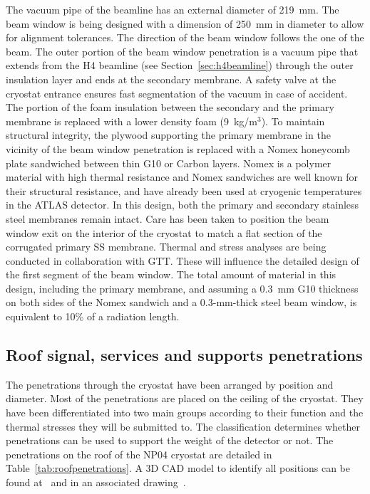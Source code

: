  The vacuum pipe of the beamline has an external diameter of 219~mm. The beam window is being designed with a dimension of 250~mm in diameter to allow for alignment tolerances.  The direction of the beam window follows the one of the beam.
The outer portion of the
beam window penetration is a vacuum pipe that extends from the H4 beamline (see Section~\ref{sec:h4beamline})  through the outer insulation layer and ends at the secondary
membrane. A safety valve at the cryostat entrance ensures fast segmentation of the vacuum in case of accident.   The
portion of the foam insulation between the secondary and the primary
membrane is replaced with a lower density foam %
(9~kg/m$^3$).
To maintain structural integrity, the plywood supporting
the primary membrane in the vicinity of the beam window penetration is
replaced with a Nomex honeycomb plate sandwiched between thin G10 or Carbon layers. Nomex is a polymer material with high thermal resistance and Nomex sandwiches are well known for their structural resistance, and have already been used at cryogenic temperatures in the ATLAS detector.
 In this design, both the
primary and secondary stainless steel membranes remain intact. Care has been taken to position the beam window exit on the interior of the cryostat to match a flat section of the corrugated primary SS membrane.
Thermal and stress analyses are being conducted in collaboration with GTT. These will influence the detailed design of the first segment of the beam window. 
The total amount of material in this design, including the primary membrane, and assuming a 0.3~mm G10 thickness on both sides of the Nomex sandwich and a 0.3-mm-thick steel beam window, is equivalent to 10\% of a radiation length. 

\subsection{Roof signal, services and supports penetrations}

The penetrations through the cryostat have been arranged by position and diameter. %
Most of the penetrations are placed on the ceiling of the cryostat. They have been differentiated into two main groups according to their function and the thermal stresses they will be submitted to. The classification determines whether penetrations can be used to support the weight of the detector or not.
The penetrations on the roof of the NP04 cryostat are detailed in Table~\ref{tab:roofpenetrations}.  
A 3D CAD model to identify all positions can be found at~\cite{edms4} and in an associated drawing~\cite{edms5}.


